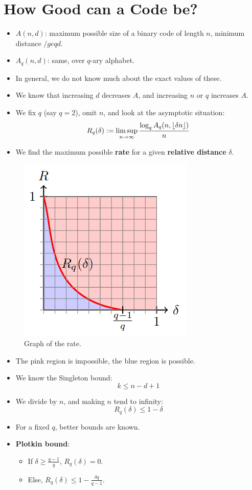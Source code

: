 \documentclass[11pt]{article}
\DeclarePairedDelimiter\floor{\lfloor}{\rfloor}
\begin{document}
\section{How Good can a Code be?}
\begin{itemize}
  \item $A(n, d)$: maximum possible size of a binary code of length $n$, minimum distance $/geq d$.
  \item $A_q(n, d)$: same, over $q$-ary alphabet.
  \item In general, we do not know much about the exact values of these.
  \item We know that increasing $d$ decreases $A$, and increasing $n$ or $q$ increases $A$.
  \item We fix $q$ (say $q = 2$), omit $n$, and look at the asymptotic situation:
    \[
      R_q(\delta) := \limsup_{n \rightarrow \infty} \frac{\log_q A_q(n, \floor{\delta n})}{n}
    \]
  \item We find the maximum possible \textbf{rate} for a given \textbf{relative distance} $\delta$.
\end{itemize}


\begin{figure}[h]
  \caption{Graph of the rate.}
  \includegraphics[scale=0.4]{rategraph}
  \centering
\end{figure}

\begin{itemize}
  \item The pink region is impossible, the blue region is possible.
  \item We know the Singleton bound:
    \[
      k \leq n - d + 1
    \]
  \item We divide by $n$, and making $n$ tend to infinity:
    \[
      R_q(\delta) \leq 1 - \delta
    \]
  \item For a fixed $q$, better bounds are known.
  \item \textbf{Plotkin bound}:
    \begin{itemize}
      \item If $\delta \geq \frac{q - 1}{q}$, $R_q(\delta) = 0$.
      \item Else, $R_q(\delta) \leq 1 - \frac{\delta q}{q - 1}$.
    \end{itemize}
\end{itemize}
\end{document}
